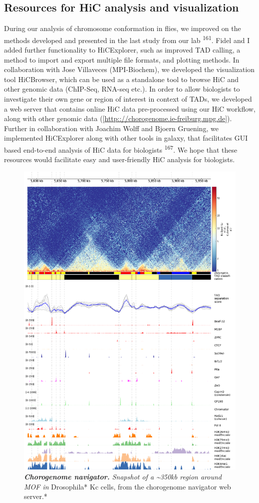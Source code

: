 \documentclass[11pt,twoside]{MPIthesis}
\theoremstyle{definition}
\theoremstyle{definition}
\theoremstyle{definition}
\theoremstyle{remark}
\begin{document}
\subsection{Resources for HiC analysis and
visualization}\label{resources-for-hic-analysis-and-visualization}

During our analysis of chromosome conformation in flies, we improved on
the methods developed and presented in the last study from our lab
\textsuperscript{161}. Fidel and I added further functionality to
HiCExplorer, such as improved TAD calling, a method to import and export
multiple file formats, and plotting methods. In collaboration with Jose
Villaveces (MPI-Biochem), we developed the visualization tool
HiCBrowser, which can be used as a standalone tool to browse HiC and
other genomic data (ChIP-Seq, RNA-seq etc.). In order to allow
biologists to investigate their own gene or region of interest in
context of TADs, we developed a web server that contains online HiC data
pre-processed using our HiC workflow, along with other genomic data
({[}{\url{http:://chorogenome.ie-freiburg.mpg.de}}{]}). Further in
collaboration with Joachim Wolff and Bjoern Gruening, we implemented
HiCExplorer along with other tools in galaxy, that facilitates GUI based
end-to-end analysis of HiC data for biologists \textsuperscript{167}. We
hope that these resources would facilitate easy and user-friendly HiC
analysis for biologists.
\begin{figure}

{\centering \includegraphics[width=0.7\linewidth]{figures/results_fig3} 

}

\caption[Chorogenome navigator]{\emph{\textbf{Chorogenome navigator.} Snapshot of a
\textasciitilde{}350kb region around MOF in }Drosophila* Kc cells, from
the chorogenome navigator web server.*}\label{fig:unnamed-chunk-8}
\end{figure}
\end{document}

